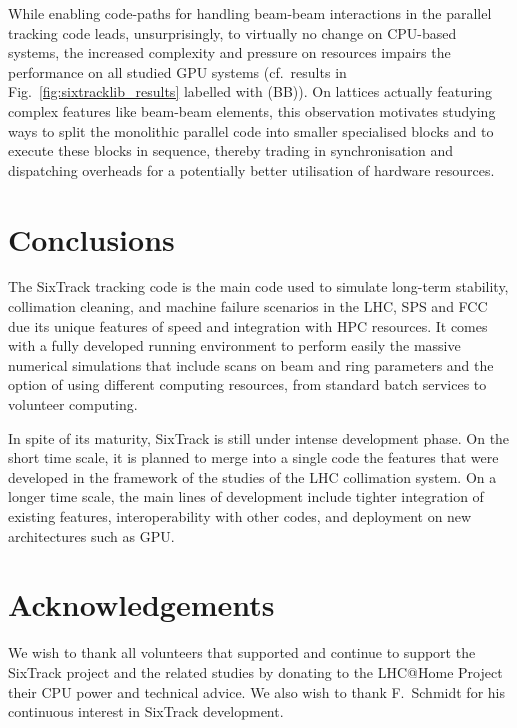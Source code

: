 \documentclass[a4paper,
              ]{jacow}
\begin{document}
While enabling code-paths for handling beam-beam interactions in the parallel tracking code leads, unsurprisingly, to virtually no change on CPU-based systems, the increased complexity and pressure on resources impairs the performance on all studied GPU systems (cf.\ results in Fig.~\ref{fig:sixtracklib_results} labelled with (BB)).
On lattices actually featuring complex features like beam-beam elements, this observation motivates studying ways to split the monolithic parallel code into smaller specialised blocks and to execute these blocks in sequence, thereby trading in synchronisation and dispatching overheads for a potentially better utilisation of hardware resources.

\section{Conclusions}

The SixTrack tracking code is the main code used to simulate long-term stability, collimation cleaning, and machine failure scenarios in the LHC, SPS and FCC due its unique features of speed and integration with HPC resources. It comes with a fully developed running environment to perform easily the massive numerical simulations that include scans on beam and ring parameters and the option of using different computing resources, from standard batch services to volunteer computing. 

In spite of its maturity, SixTrack is still under intense development phase. On the short time scale, it is planned to merge into a single code the features that were developed in the framework of the studies of the LHC collimation system. On a longer time scale, the main lines of development include  tighter integration of existing features, interoperability with other codes, and deployment on new architectures such as GPU.

\section{Acknowledgements}

We wish to thank all volunteers that supported and continue to support the SixTrack project and the related studies by donating  to the LHC@Home Project their CPU power and technical advice. We also wish to thank F.~Schmidt for his continuous interest in SixTrack development.
\end{document}
